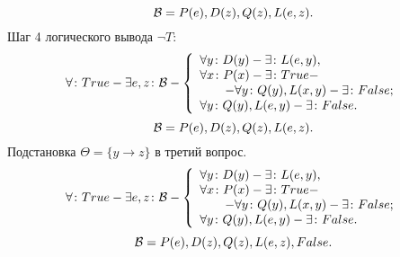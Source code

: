 \documentclass[12pt]{article}
\begin{document}
$$
{\cal{} B} = P(e),D(z),Q(z),L(e,z).
$$
\newpage{}
\noindent{}Шаг 4 логического вывода $\neg{}T$:
$$
\forall\colon True - \exists e, z\colon {\cal{} B}- \left\{
\begin{array}{lcl}
 \forall y \colon D(y) - \exists{}\colon{} L(e,y), \\
 \forall x \colon P(x) - \exists\colon{} True - \\
 \hspace{2em} - \forall{} y \colon{} Q(y),L(x,y) - \exists{}\colon{} False;\\{}
 \forall{} y \colon{} Q(y),L(e,y) - \exists{}\colon{} False.
\end{array}
\right.
$$
$$
{\cal{} B} = P(e),D(z),Q(z),L(e,z).
$$
Подстановка $\Theta=\{y \rightarrow{} z\}$ в третий вопрос.
$$
\forall\colon True - \exists e, z\colon {\cal{} B}- \left\{
\begin{array}{lcl}
 \forall y \colon D(y) - \exists{}\colon{} L(e,y), \\
 \forall x \colon P(x) - \exists\colon{} True - \\
 \hspace{2em} - \forall{} y \colon{} Q(y),L(x,y) - \exists{}\colon{} False;\\{}
 \forall{} y \colon{} Q(y),L(e,y) - \exists{}\colon{} False.
\end{array}
\right.
$$
$$
{\cal{} B} = P(e),D(z),Q(z),L(e,z),False.
$$
\end{document}
